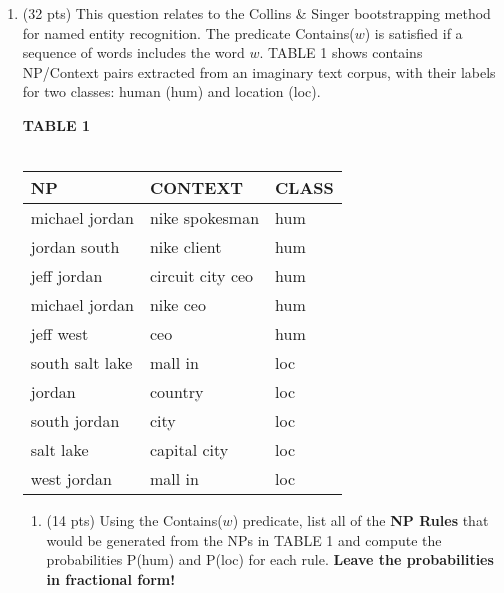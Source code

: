 \documentclass[11pt]{article}
\begin{document}
\begin{enumerate}
\newpage
\item (32 pts) This question relates to the Collins \& Singer
  bootstrapping method for named entity recognition.  The predicate
  Contains($w$) is satisfied if a sequence of words includes the word
  $w$. TABLE 1 shows contains NP/Context pairs extracted
  from an imaginary text corpus, with their labels for two classes:
  {\sc human (hum)} and {\sc location (loc)}. 

\begin{center}
\textbf{TABLE 1} \\
~ \\
\begin{tabular}{|lll|} \hline
\textbf{NP}  & \textbf{CONTEXT} & \textbf{CLASS} \\ \hline
michael jordan & nike spokesman & {\sc hum} \\
jordan south & nike client & {\sc hum} \\
jeff jordan & circuit city ceo  & {\sc hum} \\ 
michael jordan & nike ceo  & {\sc hum} \\ 
jeff west & ceo  & {\sc hum} \\ 
south salt lake & mall in & {\sc loc} \\
jordan & country & {\sc loc} \\
south jordan & city & {\sc loc} \\ 
salt lake & capital city & {\sc loc} \\
west jordan & mall in & {\sc loc} \\ 
\hline
\end{tabular}
\end{center}

\begin{enumerate}
\item (14 pts) Using the Contains($w$) predicate, list all of the 
{\bf NP Rules} that would be generated from the NPs in TABLE
  1 and compute the probabilities P({\sc hum}) and P({\sc loc}) for each
  rule. \textbf{Leave the probabilities in   fractional form!}  \\ 


\end{enumerate}
\end{enumerate}
\end{document}
